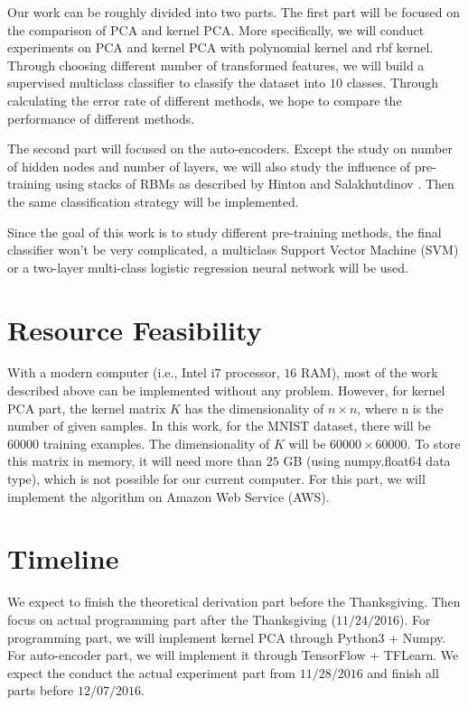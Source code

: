 \documentclass{article}
\begin{document}
Our work can be roughly divided into two parts. The first part will be focused on the comparison of PCA and kernel PCA. More specifically, we will conduct experiments on PCA and kernel PCA with polynomial kernel and rbf kernel. Through choosing different number of transformed features, we will build a supervised multiclass classifier to classify the dataset into $10$ classes. Through calculating the error rate of different methods, we hope to compare the performance of different methods.

The second part will focused on the auto-encoders. Except the study on number of hidden nodes and number of layers, we will also study the influence of pre-training using stacks of RBMs as described by Hinton and Salakhutdinov \cite{hinton2006reducing}. Then the same classification strategy will be implemented.

Since the goal of this work is to study different pre-training methods, the final classifier won't be very complicated, a multiclass Support Vector Machine (SVM) or a two-layer multi-class logistic regression neural network will be used.

\section{Resource Feasibility}
\label{sec:feasibility}

With a modern computer (i.e., Intel i$7$ processor, $16$ RAM), most of the work described above can be implemented without any problem. However, for kernel PCA part, the kernel matrix $K$ has the dimensionality of $n \times n$, where n is the number of given samples. In this work, for the MNIST dataset, there will be $60000$ training examples. The dimensionality of $K$ will be $60000 \times 60000$. To store this matrix in memory, it will need more than $25$ GB (using numpy.float64 data type), which is not possible for our current computer. For this part, we will implement the algorithm on Amazon Web Service (AWS).

\section{Timeline}
\label{sec:timeline}

We expect to finish the theoretical derivation part before the Thanksgiving. Then focus on actual programming part after the Thanksgiving ($11/24/2016$). For programming part, we will implement kernel PCA through Python3 + Numpy. For auto-encoder part, we will implement it through TensorFlow + TFLearn. We expect the conduct the actual experiment part from $11/28/2016$ and finish all parts before $12/07/2016$.

\vfill\pagebreak


%

\end{document}
